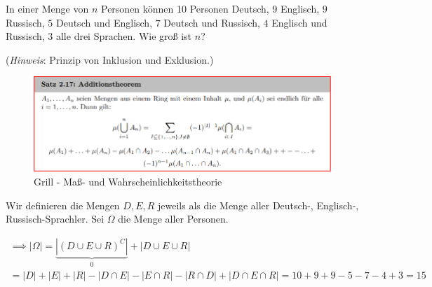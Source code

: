 
\begin{exercise}

In einer Menge von $n$ Personen können 10 Personen Deutsch, $9$ Englisch, $9$ Russisch, $5$ Deutsch und Englisch, $7$ Deutsch und Russisch, $4$ Englisch und Russisch, $3$ alle drei Sprachen.
Wie groß ist $n$?

(\textit{Hinweis}: Prinzip von Inklusion und Exklusion.)

\end{exercise}


\begin{solution}

\phantom{}


\begin{figure}[h!]
  \centering
  \includegraphics[width = 0.75 \textwidth]{Grill - Maß- und Wahrscheinlichkeitstheorie - Satz 2-17.png}
  \caption{Grill - Maß- und Wahrscheinlichkeitstheorie}
\end{figure}

Wir definieren die Mengen $D, E, R$ jeweils als die Menge aller Deutsch-, Englisch-, Russisch-Sprachler.
Sei $\Omega$ die Menge aller Personen.

\begin{multline*}
  \implies
  |\Omega|
  =
  \underbrace{|(D \cup E \cup R)^C|}_0
  +
  |D \cup E \cup R| \\
  =
  |D| + |E| + |R| - |D \cap E| - |E \cap R| - |R \cap D| + |D \cap E \cap R|
  =
  10 + 9 + 9 - 5 - 7 - 4 + 3
  =
  15
\end{multline*}

\end{solution}

